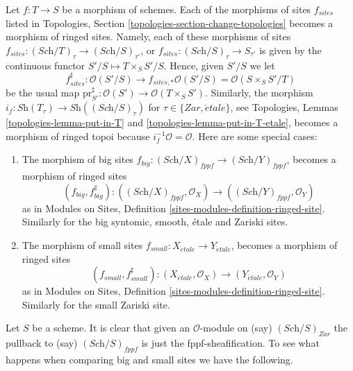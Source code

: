 \begin{remark}
\label{remark-change-topologies-ringed}
Let $f : T \to S$ be a morphism of schemes.
Each of the morphisms of sites $f_{sites}$ listed in
Topologies, Section \ref{topologies-section-change-topologies}
becomes a morphism of ringed sites. Namely, each of these morphisms of sites
$f_{sites} : (\textit{Sch}/T)_\tau \to (\textit{Sch}/S)_{\tau'}$, or
$f_{sites} : (\textit{Sch}/S)_\tau \to S_{\tau'}$ is given by the continuous
functor $S'/S \mapsto T \times_S S'/S$. Hence, given $S'/S$ we let
$$
f_{sites}^\sharp :
\mathcal{O}(S'/S)
\longrightarrow
f_{sites, *}\mathcal{O}(S'/S) =
\mathcal{O}(S \times_S S'/T)
$$
be the usual map
$\text{pr}_{S'}^\sharp : \mathcal{O}(S') \to \mathcal{O}(T \times_S S')$.
Similarly, the morphism
$i_f : \textit{Sh}(T_\tau) \to \textit{Sh}((\textit{Sch}/S)_\tau)$
for $\tau \in \{Zar, \acute{e}tale\}$, see
Topologies, Lemmas \ref{topologies-lemma-put-in-T} and
\ref{topologies-lemma-put-in-T-etale},
becomes a morphism of ringed topoi because $i_f^{-1}\mathcal{O} = \mathcal{O}$.
Here are some special cases:
\begin{enumerate}
\item The morphism of big sites
$f_{big} : (\textit{Sch}/X)_{fppf} \to (\textit{Sch}/Y)_{fppf}$,
becomes a morphism of ringed sites
$$
(f_{big}, f_{big}^\sharp) :
((\textit{Sch}/X)_{fppf}, \mathcal{O}_X)
\longrightarrow
((\textit{Sch}/Y)_{fppf}, \mathcal{O}_Y)
$$
as in Modules on Sites, Definition \ref{sites-modules-definition-ringed-site}.
Similarly for the big syntomic, smooth, \'etale and Zariski sites.
\item The morphism of small sites
$f_{small} : X_{\acute{e}tale} \to Y_{\acute{e}tale}$,
becomes a morphism of ringed sites
$$
(f_{small}, f_{small}^\sharp) :
(X_{\acute{e}tale}, \mathcal{O}_X)
\longrightarrow
(Y_{\acute{e}tale}, \mathcal{O}_Y)
$$
as in Modules on Sites, Definition \ref{sites-modules-definition-ringed-site}.
Similarly for the small Zariski site.
\end{enumerate}
\end{remark}

\noindent
Let $S$ be a scheme. It is clear that given an $\mathcal{O}$-module on (say)
$(\textit{Sch}/S)_{Zar}$ the pullback to (say) $(\textit{Sch}/S)_{fppf}$
is just the fppf-sheafification. To see what happens when comparing
big and small sites we have the following.

